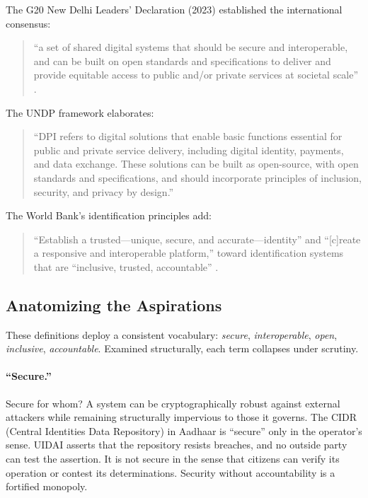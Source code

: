 \documentclass{article}
\begin{document}
The G20 New Delhi Leaders' Declaration (2023) established the international consensus:

\begin{quote}
``a set of shared digital systems that should be secure and interoperable, and can be built on open standards and specifications to deliver and provide equitable access to public and/or private services at societal scale'' \citep{g20}.
\end{quote}

The UNDP framework \citep{undp} elaborates:

\begin{quote}
``DPI refers to digital solutions that enable basic functions essential for public and private service delivery, including digital identity, payments, and data exchange. These solutions can be built as open-source, with open standards and specifications, and should incorporate principles of inclusion, security, and privacy by design.''
\end{quote}

The World Bank's identification principles add:

\begin{quote}
``Establish a trusted---unique, secure, and accurate---identity'' and ``[c]reate a responsive and interoperable platform,'' toward identification systems that are ``inclusive, trusted, accountable'' \citep{worldbank2021id4d}.
\end{quote}

\subsection{Anatomizing the Aspirations}

These definitions deploy a consistent vocabulary: \textit{secure}, \textit{interoperable}, \textit{open}, \textit{inclusive}, \textit{accountable}. Examined structurally, each term collapses under scrutiny.

\paragraph{``Secure.''}  Secure for whom? A system can be cryptographically robust against external attackers while remaining structurally impervious to those it governs. The CIDR (Central Identities Data Repository) in Aadhaar is ``secure'' only in the operator's sense. UIDAI asserts that the repository resists breaches, and no outside party can test the assertion. It is not secure in the sense that citizens can verify its operation or contest its determinations. Security without accountability is a fortified monopoly.
\end{document}
